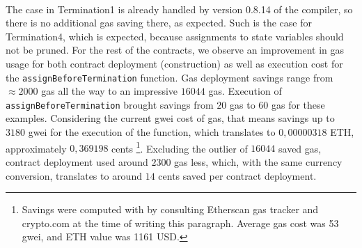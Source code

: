 \paragraph*{}
The case in Termination1 is already handled by version 0.8.14 of the compiler, so there is no additional gas saving there, as expected. Such is the case for Termination4, which is expected, because assignments to state variables should not be pruned. For the rest of the contracts, we observe an improvement in gas usage for both contract deployment (construction) as well as execution cost for the \lstinline[columns=fixed]{assignBeforeTermination} function. Gas deployment savings range from $\approx2000$ gas all the way to an impressive $16044$ gas. Execution of \lstinline[columns=fixed]{assignBeforeTermination} brought savings from $20$ gas to $60$ gas for these examples. Considering the current gwei cost of gas, that means savings up to $3180$ gwei for the execution of the function, which translates to $0,00000318$ ETH, approximately $0,369198$ cents \footnote{Savings were computed with by consulting Etherscan gas tracker and crypto.com at the time of writing this paragraph. Average gas cost was 53 gwei, and ETH value was 1161 USD.}. Excluding the outlier of $16044$ saved gas, contract deployment used around $2300$ gas less, which, with the same currency conversion, translates to around $14$ cents saved per contract deployment.
